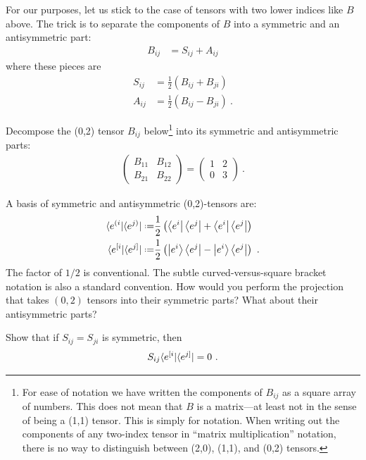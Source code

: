 \begin{subappendices}
For our purposes, let us stick to the case of tensors with two lower indices like $B$ above. The trick is to separate the components of $B$ into a symmetric and an antisymmetric part:
\begin{align}
    B_{ij} &= S_{ij}+A_{ij}
\end{align}
where these pieces are 
\begin{align}
    S_{ij} &= \frac{1}{2} \left(B_{ij} + B_{ji}\right)
    \\
    A_{ij} &= \frac{1}{2} \left(B_{ij} - B_{ji}\right) \ .
\end{align}
\begin{exercise}
Decompose the (0,2) tensor $B_{ij}$ below\footnote{For ease of notation we have written the components of $B_{ij}$ as a square array of numbers. This does not mean that $B$ is a matrix---at least not in the sense of being a (1,1) tensor. This is simply for notation. When writing out the components of any two-index tensor in ``matrix multiplication'' notation, there is no way to distinguish between (2,0), (1,1), and (0,2) tensors.} into its symmetric and antisymmetric parts:
\begin{align}
    \begin{pmatrix}
        B_{11} & B_{12}\\
        B_{21} & B_{22}
    \end{pmatrix}
    =
    \begin{pmatrix}
        1 & 2\\
        0 & 3
    \end{pmatrix} \ .
\end{align}
\end{exercise}


\begin{exercise}
A basis of symmetric and antisymmetric (0,2)-tensors are:
\begin{align}
    \la{e^{(i}}|\la{e^{j)}}|
    \defeq&
    \frac{1}{2}\left( 
        \bra{e^i}\bra{e^j} + \bra{e^i}\bra{e^j}
    \right)
    \\
    \la{e^{[i}}|\la{e^{j]}}|
    \defeq&
    \frac{1}{2}\left( 
        \ket{e^i}\bra{e^j} - \ket{e^i}\bra{e^j}
    \right) \ .
\end{align}
The factor of $1/2$ is conventional. The subtle curved-versus-square bracket notation is also a standard convention. How would you perform the projection that takes $(0,2)$ tensors into their symmetric parts? What about their antisymmetric parts?

Show that if $S_{ij} = S_{ji}$ is symmetric, then 
\begin{align}
     S_{ij}\langle{e^{[i}}|\langle{e^{j]}}| = 0 \ .
 \end{align}
\end{exercise}



\end{subappendices}
